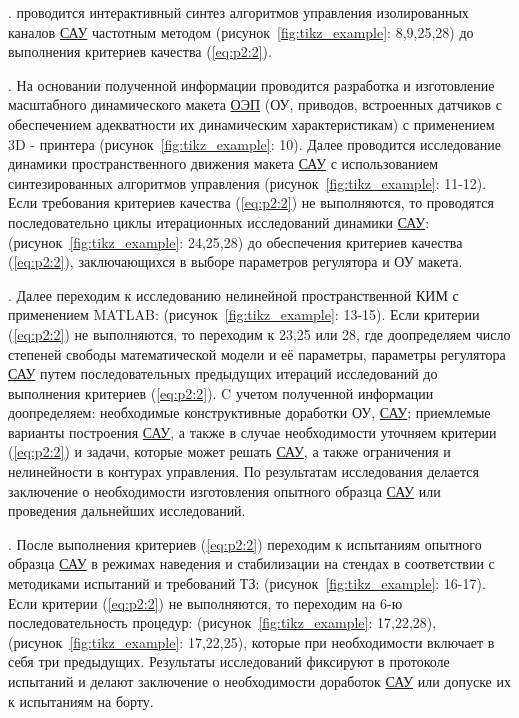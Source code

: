  . проводится интерактивный синтез алгоритмов управления изолированных каналов \hyperref[acroSAU]{САУ} частотным методом \cite[]{Bessekerski20} (рисунок~\ref{fig:tikz_example}: 8,9,25,28) до выполнения критериев качества (\ref{eq:p2:2}). 
	
 . На основании полученной информации проводится разработка и изготовление масштабного динамического макета \hyperref[acroEOS]{ОЭП} (ОУ, приводов, встроенных датчиков с обеспечением адекватности их динамическим характеристикам) с применением 3D - принтера (рисунок~\ref{fig:tikz_example}: 10). Далее проводится исследование динамики пространственного движения макета \hyperref[acroSAU]{САУ} с использованием синтезированных алгоритмов управления (рисунок~\ref{fig:tikz_example}: 11-12). Если требования критериев качества (\ref{eq:p2:2}) не выполняются, то проводятся последовательно циклы итерационных исследований динамики \hyperref[acroSAU]{САУ}: (рисунок~\ref{fig:tikz_example}: 24,25,28) до обеспечения критериев качества (\ref{eq:p2:2}), заключающихся в выборе параметров регулятора и ОУ макета.
	
 . Далее переходим к исследованию нелинейной пространственной КИМ с применением MATLAB: (рисунок~\ref{fig:tikz_example}: 13-15). Если критерии (\ref{eq:p2:2}) не выполняются, то переходим к 23,25 или 28, где доопределяем число степеней свободы математической модели и её параметры, параметры регулятора \hyperref[acroSAU]{САУ} путем последовательных предыдущих итераций исследований до выполнения критериев (\ref{eq:p2:2}). C учетом полученной информации доопределяем: необходимые конструктивные доработки ОУ, \hyperref[acroSAU]{САУ}; приемлемые варианты построения \hyperref[acroSAU]{САУ}, а также в случае необходимости уточняем критерии (\ref{eq:p2:2}) и задачи, которые может решать \hyperref[acroSAU]{САУ}, а также ограничения и нелинейности в контурах управления. По результатам исследования делается заключение о необходимости изготовления опытного образца \hyperref[acroSAU]{САУ} или проведения дальнейших исследований.
	
 . После выполнения критериев (\ref{eq:p2:2}) переходим к испытаниям опытного образца \hyperref[acroSAU]{САУ} в режимах наведения и стабилизации на стендах в соответствии с методиками испытаний и требований ТЗ: (рисунок~\ref{fig:tikz_example}: 16-17). Если критерии (\ref{eq:p2:2}) не выполняются, то переходим на 6-ю последовательность процедур: (рисунок~\ref{fig:tikz_example}: 17,22,28), (рисунок~\ref{fig:tikz_example}: 17,22,25), которые при необходимости включает в себя три предыдущих. Результаты исследований фиксируют в протоколе испытаний и делают заключение о необходимости доработок \hyperref[acroSAU]{САУ} или допуске их к испытаниям на борту. 
	
